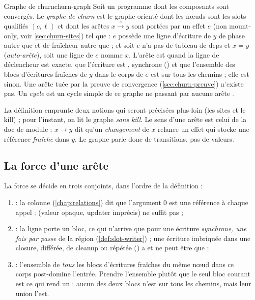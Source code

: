 \begin{definition}{Graphe de churn}{churn-graph}
Soit un programme dont les composants sont convergés. Le \emph{graphe de churn} est le
graphe orienté dont les nœuds sont les slots qualifiés $(c, \ell)$ et dont les arêtes
$x \xrightarrow{e} y$ sont portées par un effet $e$ (non mount-only, voir
\cref{sec:churn-sites}) tel que : $e$ possède une ligne d'écriture de $y$ de phase
autre que  et de fraîcheur autre que  ; et soit $e$ n'a pas de
tableau de deps et $x = y$ (\emph{auto-arête}), soit une ligne 
de $e$ nomme $x$. L'arête est  quand la ligne de déclencheur est exacte, que
l'écriture est , synchrone () et que l'ensemble des blocs
d'écritures fraîches de $y$ dans le corps de $e$ est sur tous les chemins ; elle est
 sinon. Une arête tuée par la preuve de convergence
(\cref{sec:churn-preuve}) n'existe pas. Un \emph{cycle} est un cycle simple de ce graphe
ne passant par aucune arête .
\end{definition}

La définition emprunte deux notions qui seront précisées plus loin (les sites et le kill) ;
pour l'instant, on lit le graphe \emph{sans kill}. Le sens d'une arête est celui de la doc
de module : $x \to y$ dit qu'un \emph{changement} de $x$ relance un effet qui stocke une
référence \emph{fraîche} dans $y$. Le graphe parle donc de transitions, pas de valeurs.

\subsection{La force d'une arête}


La force se décide en trois conjoints, dans l'ordre de la définition :
\begin{enumerate}
  \item {} : la colonne 
        (\cref{chap:relations}) dit que l'argument 0 est une référence 
        à chaque appel ;  (valeur opaque, updater imprécis) ne suffit pas ;
  \item {} : la ligne porte un bloc, ce qui n'arrive que pour une
        écriture \emph{synchrone, une fois par passe} de la région
        (\cref{def:slot-writer}) ; une écriture imbriquée dans une closure, différée,
        de cleanup ou répétée () a  et ne peut être que
         ;
  \item {} : l'ensemble de \emph{tous} les blocs
        d'écritures fraîches du même nœud dans ce corps post-domine l'entrée. Prendre
        l'ensemble plutôt que le seul bloc courant est ce qui rend  un
         : aucun des deux blocs n'est sur tous les
        chemins, mais leur union l'est.
\end{enumerate}

